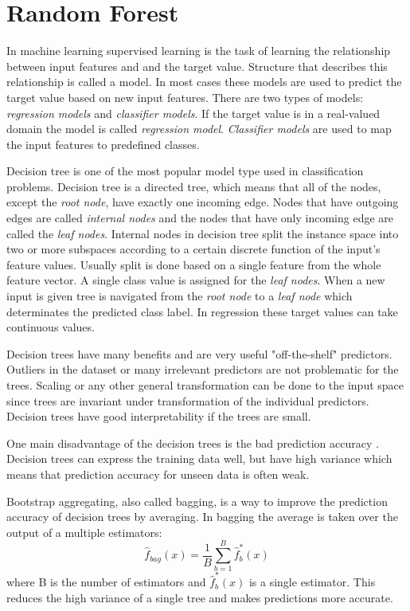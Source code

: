 \section{Random Forest}
\label{ss:randomforest}
In machine learning supervised learning is the task of learning the relationship between input features and and the target value. Structure that describes this relationship is called a model. In most cases these models are used to predict the target value based on new input features. There are two types of models: \textit{regression models} and \textit{classifier models}. If the target value is in a real-valued domain the model is called \textit{regression model}. \textit{Classifier models} are used to map the input features to predefined classes. \cite{rokach2005top}

Decision tree is one of the most popular model type used in classification problems. Decision tree is a directed tree, which means that all of the nodes, except the \textit{root node}, have exactly one incoming edge. Nodes that have outgoing edges are called \textit{internal nodes} and the nodes that have only incoming edge are called the \textit{leaf nodes}. Internal nodes in decision tree split the instance space into two or more subspaces according to a certain discrete function of the input's feature values. Usually split is done based on a single feature from the whole feature vector. A single class value is assigned for the \textit{leaf nodes}. When a new input is given tree is navigated from the \textit{root node} to a \textit{leaf node} which determinates the predicted class label. In regression these target values can take continuous values. \cite{rokach2005top}

Decision trees have many benefits and are very useful "off-the-shelf" predictors. Outliers in the dataset or many irrelevant predictors are not problematic for the trees. Scaling or any other general transformation can be done to the input space since trees are invariant under transformation of the individual predictors. \cite{friedman2001elements} Decision trees have good interpretability if the trees are small.

One main disadvantage of the decision trees is the bad prediction accuracy \cite{friedman2001elements}. Decision trees can express the training data well, but have high variance which means that prediction accuracy for unseen data is often weak.

Bootstrap aggregating, also called bagging, is a way to improve the prediction accuracy of decision trees by averaging. In bagging the average is taken over the output of a multiple estimators:
\begin{equation}
    \hat {f}_{bag}(x) = \frac{1}{B}\sum_{b = 1}^{B} \hat {f}^{*}_{b}(x)
\end{equation}
where B is the number of estimators and $\hat {f}^{*}_{b}(x)$ is a single estimator. This reduces the high variance of a single tree and makes predictions more accurate.

